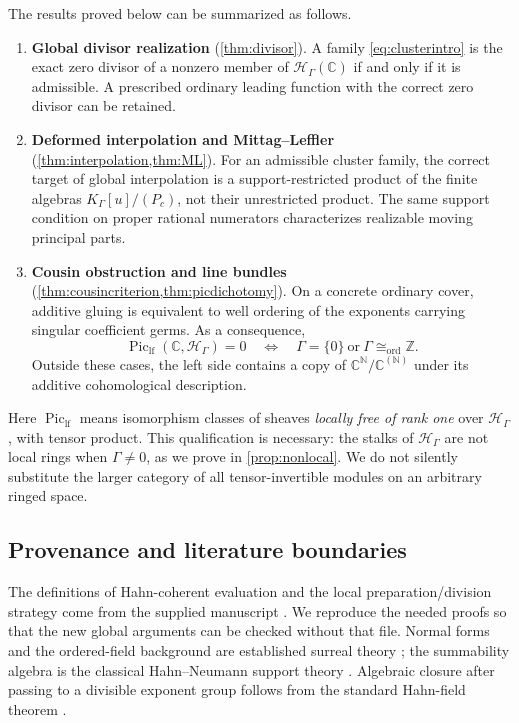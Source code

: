 \documentclass[11pt,letterpaper]{article}
\theoremstyle{definition}
\theoremstyle{remark}
\newcommand{\C}{\mathbb C}
\newcommand{\N}{\mathbb N}
\newcommand{\Z}{\mathbb Z}
\newcommand{\HH}{\mathscr H_\Gamma}
\newcommand{\KG}{K_\Gamma}
\newcommand{\Piclf}{\operatorname{Pic}_{\mathrm{lf}}}
\numberwithin{equation}{section}
\begin{document}
The results proved below can be summarized as follows.
\begin{enumerate}
\item \textbf{Global divisor realization} (\cref{thm:divisor}). A family \eqref{eq:clusterintro} is the exact zero divisor of a nonzero member of $\HH(\C)$ if and only if it is admissible. A prescribed ordinary leading function with the correct zero divisor can be retained.
\item \textbf{Deformed interpolation and Mittag--Leffler} (\cref{thm:interpolation,thm:ML}). For an admissible cluster family, the correct target of global interpolation is a support-restricted product of the finite algebras $\KG[u]/(P_c)$, not their unrestricted product. The same support condition on proper rational numerators characterizes realizable moving principal parts.
\item \textbf{Cousin obstruction and line bundles} (\cref{thm:cousincriterion,thm:picdichotomy}). On a concrete ordinary cover, additive gluing is equivalent to well ordering of the exponents carrying singular coefficient germs. As a consequence,
\begin{equation}\label{eq:picintro}
 \Piclf(\C,\HH)=0
 \quad\Longleftrightarrow\quad
 \Gamma=\{0\}\ \text{or}\ \Gamma\cong_{\mathrm{ord}}\Z.
\end{equation}
Outside these cases, the left side contains a copy of $\C^{\N}/\C^{(\N)}$ under its additive cohomological description.
\end{enumerate}
Here $\Piclf$ means isomorphism classes of sheaves \emph{locally free of rank one} over $\HH$, with tensor product. This qualification is necessary: the stalks of $\HH$ are not local rings when $\Gamma\ne0$, as we prove in \cref{prop:nonlocal}. We do not silently substitute the larger category of all tensor-invertible modules on an arbitrary ringed space.

\subsection{Provenance and literature boundaries}\label{subsec:provenance}
The definitions of Hahn-coherent evaluation and the local preparation/division strategy come from the supplied manuscript \cite{Supplied}. We reproduce the needed proofs so that the new global arguments can be checked without that file. Normal forms and the ordered-field background are established surreal theory \cite{Gonshor}; the summability algebra is the classical Hahn--Neumann support theory \cite{Neumann}. Algebraic closure after passing to a divisible exponent group follows from the standard Hahn-field theorem \cite[Corollary~4]{Poonen}.
\end{document}
